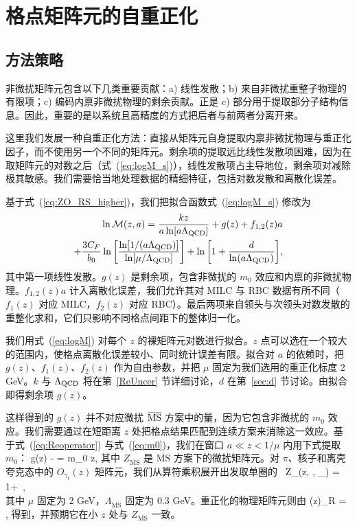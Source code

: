 \section{格点矩阵元的自重正化}\label{sec:StrtoRe}
\subsection{方法策略}\label{Strategy}

非微扰矩阵元包含以下几类重要贡献：a) 线性发散；b) 来自非微扰重整子物理的有限项；c) 编码内禀非微扰物理的剩余贡献。正是 c) 部分用于提取部分子结构信息。因此，重要的是以系统且高精度的方式把后者与前两者分离开来。

这里我们发展一种自重正化方法：直接从矩阵元自身提取内禀非微扰物理与重正化因子，而不使用另一个不同的矩阵元。剩余项的提取远比线性发散项困难，因为在取矩阵元的对数之后（式~(\ref{eq:logM_s})），线性发散项占主导地位，剩余项对减除极其敏感。我们需要恰当地处理数据的精细特征，包括对数发散和离散化误差。

基于式~(\ref{eq:ZO_RS_higher})，我们把拟合函数式~(\ref{eq:logM_s}) 修改为
\begin{align}\label{eq:logM}
\ln \mathcal{M}(z,a) = \frac{k z}{a \ln[a \Lambda_{\rm QCD}]}
+ g(z) + f_{1,2}(z)a \nonumber\\
+ \frac{3 C_{F}}{b_0} \ln \bigg[\frac{\ln [1 /(a \Lambda_{\rm QCD})]}{\ln [\mu / \Lambda_{\rm QCD}]}\bigg]+\ln \bigg[1+\frac{d}{\ln (a \Lambda_{\rm QCD})}\bigg],
\end{align}
其中第一项线性发散。$g(z)$ 是剩余项，包含非微扰的 $m_{0}$ 效应和内禀的非微扰物理。$f_{1,2}(z)a$ 计入离散化误差，我们允许其对 MILC 与 RBC 数据有所不同（$f_{1}(z)$ 对应 MILC，$f_{2}(z)$ 对应 RBC）。最后两项来自领头与次领头对数发散的重整化求和，它们只影响不同格点间距下的整体归一化。

我们用式~(\ref{eq:logM}) 对每个 $z$ 的裸矩阵元对数进行拟合。$z$ 点可以选在一个较大的范围内，使格点离散化误差较小、同时统计误差有限。拟合对 $a$ 的依赖时，把 $g(z)$、$f_{1}(z)$、$f_{2}(z)$ 作为自由参数，并把 $\mu$ 固定为我们选用的重正化标度 2 GeV。$k$ 与 $\Lambda_{\rm QCD}$ 将在第~\ref{ReUncer} 节详细讨论，$d$ 在第~\ref{sec:d} 节讨论。由拟合即得剩余项 $g(z)$。

这样得到的 $g(z)$ 并不对应微扰 $\overline{\rm MS}$ 方案中的量，因为它包含非微扰的 $m_{0}$ 效应。我们需要通过在短距离 $z$ 处把格点结果匹配到连续方案来消除这一效应。基于式~(\ref{eq:Reoperator}) 与式~(\ref{eq:m0})，我们在窗口 $a \ll z < 1/\mu$ 内用下式提取 $m_{0}$：
\bea\label{eq:gztoMS}
g(z) -  = m_{0} z,
\eea
其中 $Z_{\overline{\mathrm{MS}}}$ 是 $\overline{\mathrm{MS}}$ 方案下的微扰矩阵元。对 $\pi$、核子和离壳夸克态中的 $O_{\gamma_t}(z)$ 矩阵元，我们从算符乘积展开出发取单圈的~\cite{Izubuchi:2018srq}
\bea\label{eq:ZMS}
Z_{}(z, \mu, \Lambda_{}) = 1+\ , \nonumber\\
\eea
其中 $\mu$ 固定为 2 GeV，$\Lambda_{\overline{\mathrm{MS}}}$ 固定为 0.3 GeV。重正化的物理矩阵元则由
\bea\label{eq:gz-m0}
(z)_{R} = \exp[g(z) - m_{0}z],
\eea
得到，并预期它在小 $z$ 处与 $Z_{\overline{\mathrm{MS}}}$ 一致。

